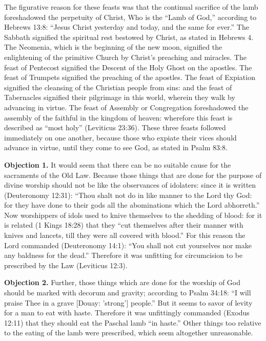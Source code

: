 The figurative reason for these feasts was that the continual sacrifice of the lamb foreshadowed the perpetuity of Christ, Who is the ``Lamb of God,'' according to Hebrews 13:8: ``Jesus Christ yesterday and today, and the same for ever.'' The Sabbath signified the spiritual rest bestowed by Christ, as stated in Hebrews 4. The Neomenia, which is the beginning of the new moon, signified the enlightening of the primitive Church by Christ's preaching and miracles. The feast of Pentecost signified the Descent of the Holy Ghost on the apostles. The feast of Trumpets signified the preaching of the apostles. The feast of Expiation signified the cleansing of the Christian people from sins: and the feast of Tabernacles signified their pilgrimage in this world, wherein they walk by advancing in virtue. The feast of Assembly or Congregation foreshadowed the assembly of the faithful in the kingdom of heaven: wherefore this feast is described as ``most holy'' (Leviticus 23:36). These three feasts followed immediately on one another, because those who expiate their vices should advance in virtue, until they come to see God, as stated in Psalm 83:8.


\textbf{Objection 1.} It would seem that there can be no suitable cause for the sacraments of the Old Law. Because those things that are done for the purpose of divine worship should not be like the observances of idolaters: since it is written (Deuteronomy 12:31): ``Thou shalt not do in like manner to the Lord thy God: for they have done to their gods all the abominations which the Lord abhorreth.'' Now worshippers of idols used to knive themselves to the shedding of blood: for it is related (1 Kings 18:28) that they ``cut themselves after their manner with knives and lancets, till they were all covered with blood.'' For this reason the Lord commanded (Deuteronomy 14:1): ``You shall not cut yourselves nor make any baldness for the dead.'' Therefore it was unfitting for circumcision to be prescribed by the Law (Leviticus 12:3).

\textbf{Objection 2.} Further, those things which are done for the worship of God should be marked with decorum and gravity; according to Psalm 34:18: ``I will praise Thee in a grave [Douay: 'strong'] people.'' But it seems to savor of levity for a man to eat with haste. Therefore it was unfittingly commanded (Exodus 12:11) that they should eat the Paschal lamb ``in haste.'' Other things too relative to the eating of the lamb were prescribed, which seem altogether unreasonable.


